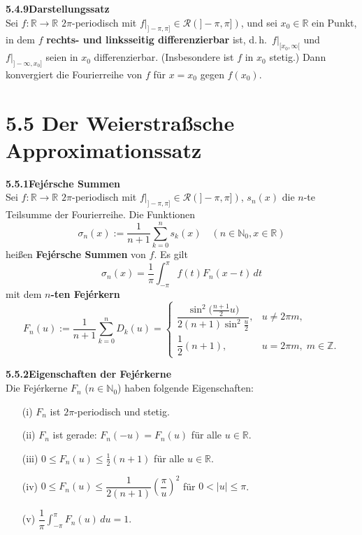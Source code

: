 \documentclass[a4paper,12pt]{article}
\newcommand{\gentry}[3]{%
  \noindent\textbf{#1\quad #2}\nopagebreak\\[0.2em]
  #3\par\smallskip
}
\begin{document}
\gentry{5.4.9}{Darstellungssatz}{%
  Sei $f: \mathbb{R} \to \mathbb{R}$ $2\pi$-periodisch mit
  $f|_{]-\pi,\pi]} \in \mathcal{R}(]-\pi,\pi])$, und sei $x_0 \in \mathbb{R}$ ein
  Punkt, in dem $f$ \textbf{rechts- und linksseitig differenzierbar} ist, d.\,h.\
  $f|_{[x_0, \infty[}$ und $f|_{]-\infty, x_0]}$ seien in $x_0$ differenzierbar.
  (Insbesondere ist $f$ in $x_0$ stetig.) Dann konvergiert die Fourierreihe von
  $f$ für $x = x_0$ gegen $f(x_0)$.
}

\section*{5.5 \quad Der Weierstraßsche Approximationssatz}

\gentry{5.5.1}{Fejérsche Summen}{%
  Sei $f: \mathbb{R} \to \mathbb{R}$ $2\pi$-periodisch mit $f|_{]-\pi,\pi]} \in \mathcal{R}(]-\pi,\pi])$,
  $s_n(x)$ die $n$-te Teilsumme der Fourierreihe. Die Funktionen
  \[
    \sigma_n(x) := \frac{1}{n+1} \sum_{k=0}^n s_k(x) \quad (n \in \mathbb{N}_0, x \in \mathbb{R})
  \]
  heißen \textbf{Fejérsche Summen} von $f$. Es gilt
  \[
    \sigma_n(x) = \frac{1}{\pi} \int_{-\pi}^\pi f(t) F_n(x-t)\,dt
  \]
  mit dem \textbf{$n$-ten Fejérkern}
  \[
    F_n(u) := \frac{1}{n+1} \sum_{k=0}^n D_k(u) =
    \begin{cases}
      \dfrac{\sin^2\bigl(\frac{n+1}{2} u\bigr)}{2(n+1) \sin^2\frac{u}{2}}, & u \neq 2\pi m,\\[0.5em]
      \dfrac{1}{2}(n+1), & u = 2\pi m, \; m \in \mathbb{Z}.
    \end{cases}
  \]
}

\gentry{5.5.2}{Eigenschaften der Fejérkerne}{%
  Die Fejérkerne $F_n$ ($n \in \mathbb{N}_0$) haben folgende Eigenschaften:
  \begin{itemize}[topsep=2pt,itemsep=1pt]
    \item[(i)] $F_n$ ist $2\pi$-periodisch und stetig.
    \item[(ii)] $F_n$ ist gerade: $F_n(-u) = F_n(u)$ für alle $u \in \mathbb{R}$.
    \item[(iii)] $0 \leq F_n(u) \leq \frac{1}{2}(n+1)$ für alle $u \in \mathbb{R}$.
    \item[(iv)] $0 \leq F_n(u) \leq \dfrac{1}{2(n+1)} \left(\dfrac{\pi}{u}\right)^2$ für $0 < |u| \leq \pi$.
    \item[(v)] $\dfrac{1}{\pi} \int_{-\pi}^\pi F_n(u)\,du = 1$.
  \end{itemize}
}
\end{document}
